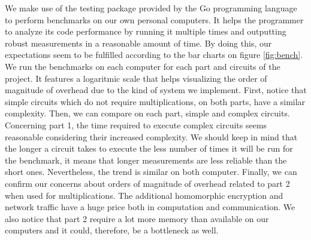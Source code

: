 \documentclass[10pt,conference]{IEEEtran}
\begin{document}
\begin{itemize}
We make use of the testing package provided by the Go programming language to perform benchmarks on our own personal computers. It helps the programmer to analyze its code performance by running it multiple times and outputting robust measurements in a reasonable amount of time. By doing this, our expectations seem to be fulfilled according to the bar charts on figure \ref{fig:bench}. We run the benchmarks on each computer for each part and circuits of the project. It features a logaritmic scale that helps visualizing the order of magnitude of overhead due to the kind of system we implement. First, notice that simple circuits which do not require multiplications, on both parts, have a similar complexity. Then, we can compare on each part, simple and complex circuits. Concerning part 1, the time required to execute complex circuits seems reasonable considering their increased complexity. We should keep in mind that the longer a circuit takes to execute the less number of times it will be run for the benchmark, it means that longer measurements are less reliable than the short ones. Nevertheless, the trend is similar on both computer. Finally, we can confirm our concerns about orders of magnitude of overhead related to part 2 when used for multiplications. The additional homomorphic encryption and network traffic have a huge price both in computation and communication. We also notice that part 2 require a lot more memory than available on our computers and it could, therefore, be a bottleneck as well.


\end{itemize}
\end{document}
